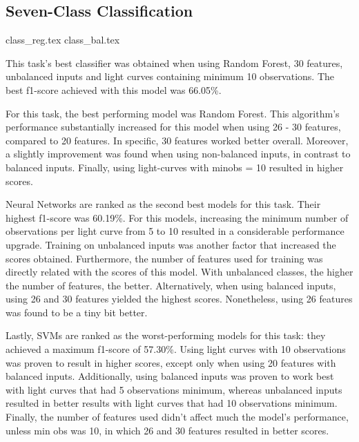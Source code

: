 \documentclass[a4paper,fleqn,usenatbib]{mnras}
\begin{document}



\subsection{Seven-Class Classification}

{class_reg.tex}
{class_bal.tex}


This task's best classifier was obtained when using Random Forest, 30 features, unbalanced inputs and light curves containing minimum 10 observations. The best f1-score achieved with this model was 66.05\%.

For this task, the best performing model was Random Forest. This algorithm's performance substantially increased for this model when using 26 - 30 features, compared to 20 features. In specific, 30 features worked better overall. Moreover, a slightly improvement was found when using non-balanced inputs, in contrast to balanced inputs. Finally, using light-curves with min\textunderscore obs = 10 resulted in higher scores.

Neural Networks are ranked as the second best models for this task. Their highest f1-score was 60.19\%. For this models, increasing the minimum number of observations per light curve from 5 to 10 resulted in a considerable performance upgrade. Training on unbalanced inputs was another factor that increased the scores obtained. Furthermore, the number of features used for training was directly related with the scores of this model. With unbalanced classes, the higher the number of features, the better. Alternatively, when using balanced inputs, using 26 and 30 features yielded the highest scores. Nonetheless, using 26 features was found to be a tiny bit better.

Lastly, SVMs are ranked as the worst-performing models for this task: they achieved a maximum f1-score of 57.30\%. Using light curves with 10 observations was proven to result in higher scores, except only when using 20 features with balanced inputs. Additionally, using balanced inputs was proven to work best with light curves that had 5 observations minimum, whereas unbalanced inputs resulted in better results with light curves that had 10 observations minimum. Finally, the number of features used didn't affect much the model's performance, unless min \textunderscore obs was 10, in which 26 and 30 features resulted in better scores.
\end{document}
